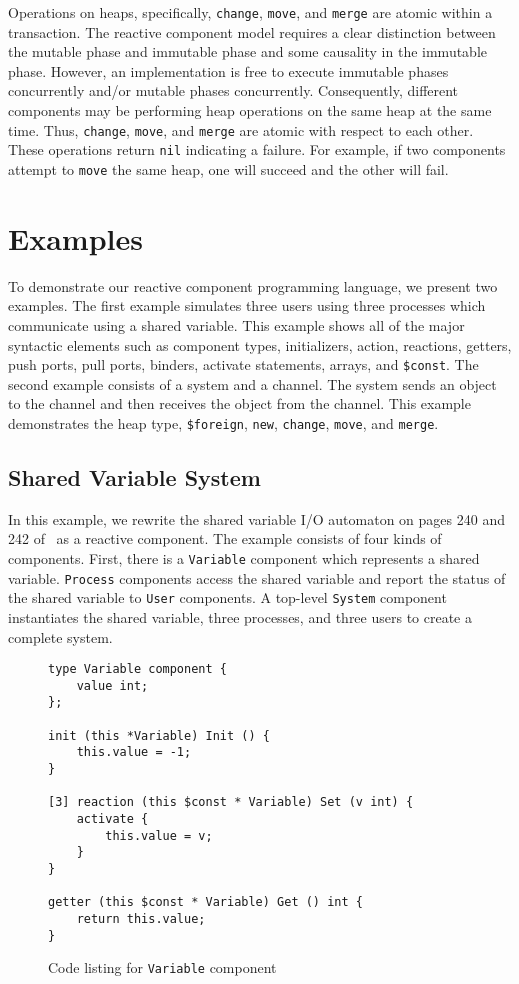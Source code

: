 Operations on heaps, specifically, \verb+change+, \verb+move+, and \verb+merge+ are atomic within a transaction.
The reactive component model requires a clear distinction between the mutable phase and immutable phase and some causality in the immutable phase.
However, an implementation is free to execute immutable phases concurrently and/or mutable phases concurrently.
Consequently, different components may be performing heap operations on the same heap at the same time.
Thus, \verb+change+, \verb+move+, and \verb+merge+ are atomic with respect to each other.
These operations return \verb+nil+ indicating a failure.
For example, if two components attempt to \verb+move+ the same heap, one will succeed and the other will fail.

\section{Examples}

To demonstrate our reactive component programming language, we present two examples.
The first example simulates three users using three processes which communicate using a shared variable.
This example shows all of the major syntactic elements such as component types, initializers, action, reactions, getters, push ports, pull ports, binders, activate statements, arrays, and \verb+$const+.
The second example consists of a system and a channel.
The system sends an object to the channel and then receives the object from the channel.
This example demonstrates the heap type, \verb+$foreign+, \verb+new+, \verb+change+, \verb+move+, and \verb+merge+.

\subsection{Shared Variable System}

In this example, we rewrite the shared variable I/O automaton on pages 240 and 242 of~\cite{nancy1996distributed} as a reactive component.
The example consists of four kinds of components.
First, there is a \verb+Variable+ component which represents a shared variable.
\verb+Process+ components access the shared variable and report the status of the shared variable to \verb+User+ components.
A top-level \verb+System+ component instantiates the shared variable, three processes, and three users to create a complete system.

\begin{figure}
\begin{verbatim}
type Variable component {
    value int;
};

init (this *Variable) Init () {
    this.value = -1;
}

[3] reaction (this $const * Variable) Set (v int) {
    activate {
        this.value = v;
    }
}

getter (this $const * Variable) Get () int {
    return this.value;
}
\end{verbatim}
\cprotect\caption{Code listing for \verb+Variable+ component \label{variable}}
\end{figure}

